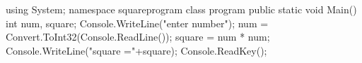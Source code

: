 using System;
namespace squareprogram
    {
    class program
{
    public static void Main()
    {
        int num, square;
        Console.WriteLine("enter number");
        num = Convert.ToInt32(Console.ReadLine());
        square = num * num;
    Console.WriteLine("square ="+square);
        Console.ReadKey();
    }
}
}